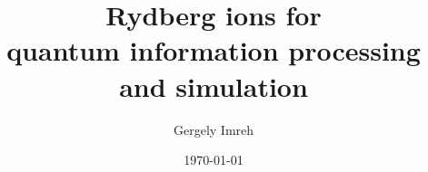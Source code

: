\documentclass[12pt]{article}
\title{Rydberg ions for\\quantum information processing and simulation}
\date{\today}
\author{Gergely Imreh}
\begin{document}
\maketitle



\newpage


\newpage
\singlespacing

\end{document}
